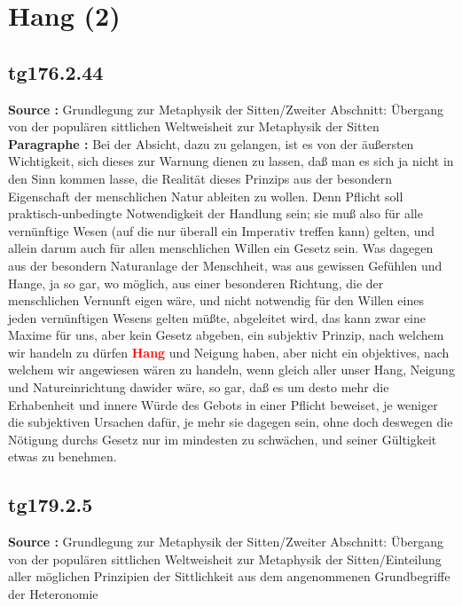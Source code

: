 \documentclass[a4paper,12pt,twoside]{book}
\newcommand{\match}[1]{\textcolor{red}{\textbf{#1}}}
\newcommand{\unnumberedsection}[1]{
	\section*{#1}
	\addcontentsline{toc}{section}{#1}
	\markright{#1}
}
\begin{document}
	\unnumberedsection{Hang (2)} 
	\subsection*{tg176.2.44} 
	\textbf{Source : }Grundlegung zur Metaphysik der Sitten/Zweiter Abschnitt: Übergang von der populären sittlichen Weltweisheit zur Metaphysik der Sitten\\  
	
	\noindent\textbf{Paragraphe : }Bei der Absicht, dazu zu gelangen, ist es von der äußersten Wichtigkeit, sich dieses zur Warnung dienen zu lassen, daß man es sich ja nicht in den Sinn kommen lasse, die Realität dieses Prinzips aus der besondern Eigenschaft der menschlichen Natur ableiten zu wollen. Denn Pflicht soll praktisch-unbedingte Notwendigkeit der Handlung sein; sie muß also für alle vernünftige Wesen (auf die nur überall ein Imperativ treffen kann) gelten, und allein darum auch für allen menschlichen Willen ein Gesetz sein. Was dagegen aus der besondern Naturanlage der Menschheit, was aus gewissen Gefühlen und Hange, ja so gar, wo möglich, aus einer besonderen Richtung, die der menschlichen Vernunft eigen wäre, und nicht notwendig für den Willen eines jeden vernünftigen Wesens gelten müßte, abgeleitet wird, das kann zwar eine Maxime für uns, aber kein Gesetz abgeben, ein subjektiv Prinzip, nach welchem wir handeln zu dürfen \match{Hang} und Neigung haben, aber nicht ein objektives, nach welchem wir angewiesen wären zu handeln, wenn gleich aller unser Hang, Neigung und Natureinrichtung dawider wäre, so gar, daß es um desto mehr die Erhabenheit und innere Würde des Gebots in einer Pflicht beweiset, je weniger die subjektiven Ursachen dafür, je mehr sie dagegen sein, ohne doch deswegen die Nötigung durchs Gesetz nur im mindesten zu schwächen, und seiner Gültigkeit etwas zu benehmen. 
	
	\subsection*{tg179.2.5} 
	\textbf{Source : }Grundlegung zur Metaphysik der Sitten/Zweiter Abschnitt: Übergang von der populären sittlichen Weltweisheit zur Metaphysik der Sitten/Einteilung aller möglichen Prinzipien der Sittlichkeit aus dem angenommenen Grundbegriffe der Heteronomie\\  
	
\end{document}
